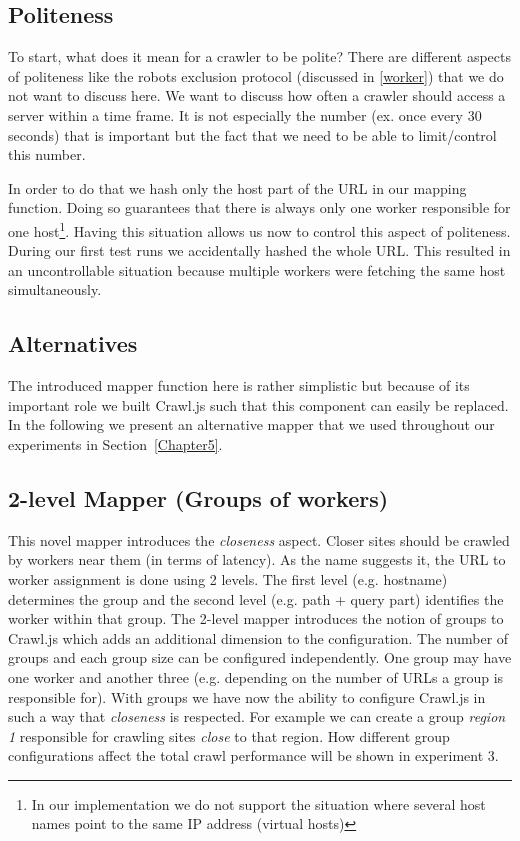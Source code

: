 \subsection{Politeness}
To start, what does it mean for a crawler to be polite? There are different aspects of politeness like the robots exclusion protocol (discussed in \ref{worker}) that we do not want to discuss here. We want to discuss how often a crawler should access a server within a time frame. It is not especially the number (ex. once every 30 seconds) that is important but the fact that we need to be able to limit/control this number.

In order to do that we hash only the host part of the URL in our mapping function. Doing so guarantees that there is always only one worker responsible for one host\footnote{In our implementation we do not support the situation where several host names point to the same IP address (virtual hosts)}. Having this situation allows us now to control this aspect of politeness.
During our first test runs we accidentally hashed the whole URL. This resulted in an uncontrollable situation because multiple workers were fetching the same host simultaneously.

\subsection{Alternatives}
The introduced mapper function here is rather simplistic but because of its important role we built Crawl.js such that this component can easily be replaced. In the following we present an alternative mapper that we used throughout our experiments in Section~\ref{Chapter5}.

\subsection{2-level Mapper (Groups of workers)}
This novel mapper introduces the \emph{closeness} aspect. Closer sites should be crawled by workers near them (in terms of latency). 
\newline
As the name suggests it, the URL to worker assignment is done using 2 levels. The first level (e.g. hostname) determines the group and the second level (e.g. path + query part) identifies the worker within that group. The 2-level mapper introduces the notion of groups to Crawl.js which adds an additional dimension to the configuration. The number of groups and each group size can be configured independently. One group may have one worker and another three (e.g. depending on the number of URLs a group is responsible for).
\newline
With groups we have now the ability to configure Crawl.js in such a way that \emph{closeness} is respected. For example we can create a group \emph{region 1} responsible for crawling sites \emph{close} to that region. How different group configurations affect the total crawl performance will be shown in experiment 3.

